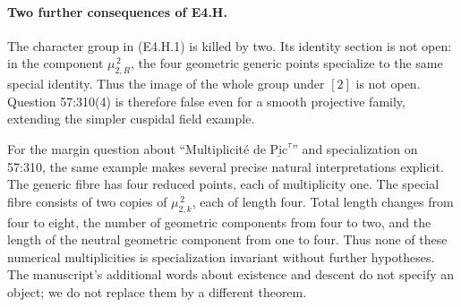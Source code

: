 \paragraph{Two further consequences of E4.H.}
The character group in (E4.H.1) is killed by two. Its identity section is
not open: in the component $\mu_{2,R}^{\,2}$, the four geometric generic
points specialize to the same special identity. Thus the image of the
whole group under $[2]$ is not open. Question 57:310(4) is therefore false
even for a smooth projective family, extending the simpler cuspidal
field example.

For the margin question about ``Multiplicit\'e de
$\underline{\mathrm{Pic}}^\tau$'' and specialization on 57:310, the same
example makes several precise natural interpretations explicit. The
generic fibre has four reduced points, each of multiplicity one. The
special fibre consists of two copies of $\mu_{2,k}^{\,2}$, each of length
four. Total length changes from four to eight, the number of geometric
components from four to two, and the length of the neutral geometric
component from one to four. Thus none of these numerical multiplicities
is specialization invariant without further hypotheses. The manuscript's
additional words about existence and descent do not specify an object;
we do not replace them by a different theorem.

